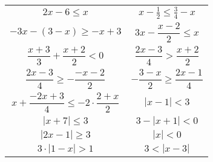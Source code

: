 \documentclass[a4paper,12pt,leqno,fleqn]{article}
\begin{document}
\begin{tabularx}{\linewidth}{@{}XX@{}}

  \begin{equation}
    2x-6\leq x
  \end{equation}
&
  \begin{equation}
    x-\tfrac{1}{2}\leq\tfrac{3}{4}-x
  \end{equation}
\\
  \begin{equation}
    -3x-(3-x)\geq-x+3
  \end{equation}
&
  \begin{equation}
    3x-\frac{x-2}{2}\leq x
  \end{equation}
\\
  \begin{equation}
    \frac{x+3}{3}+\frac{x+2}{2}<0
  \end{equation}
&
  \begin{equation}
    \frac{2x-3}{4}>\frac{x+2}{2}
  \end{equation}
\\
  \begin{equation}
    \frac{2x-3}{4}\geq-\frac{-x-2}{2}
  \end{equation}
&
  \begin{equation}
    -\frac{3-x}{2}\geq\frac{2x-1}{4}
  \end{equation}
\\
  \begin{equation}
    x+\frac{-2x+3}{4}\leq-2\cdot\frac{2+x}{2}
  \end{equation}
&
  \begin{equation}
    |x-1|<3
  \end{equation}
\\
  \begin{equation}
    |x+7|\leq3
  \end{equation}
&
  \begin{equation}
    3-|x+1|<0
  \end{equation}
\\
  \begin{equation}
    |2x-1|\geq3
  \end{equation}
&
  \begin{equation}
    |x|<0
  \end{equation}
\\
  \begin{equation}
    3\cdot|1-x|>1
  \end{equation}
&
  \begin{equation}
    3<|x-3|
  \end{equation}
\\
\end{tabularx}
\end{document}
